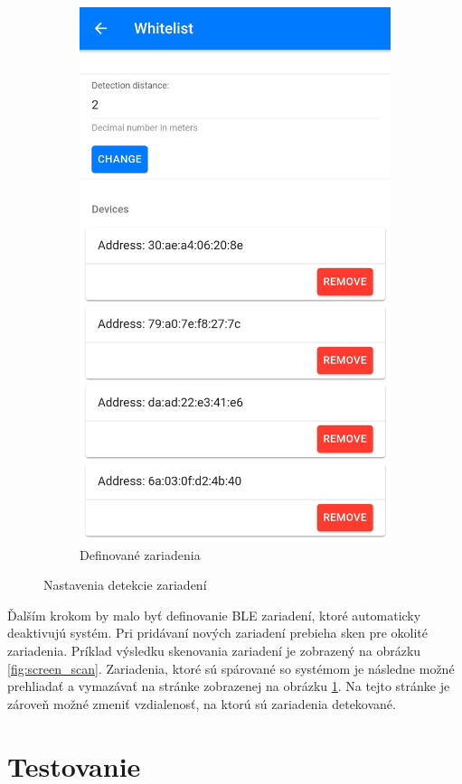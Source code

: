 \begin{figure}[!ht]
\begin{subfigure}{.4\textwidth}
      \includegraphics[width=.8\linewidth]{obrazky-figures/screen_whitelist.jpg}
      \caption{Definované zariadenia}
      \label{fig:screen_whitelist}
    \end{subfigure}
    \caption{Nastavenia detekcie zariadení}
    \label{fig:nastavenie_ble_zariadeni}
\end{figure}

Ďalším krokom by malo byť definovanie BLE zariadení, ktoré automaticky deaktivujú systém. Pri pridávaní nových zariadení prebieha sken pre okolité zariadenia. Príklad výsledku skenovania zariadení je zobrazený na obrázku \ref{fig:screen_scan}. Zariadenia, ktoré sú spárované so systémom je následne možné prehliadať a vymazávať na stránke zobrazenej na obrázku \ref{fig:screen_whitelist}. Na tejto stránke je zároveň možné zmeniť vzdialenosť, na ktorú sú zariadenia detekované.


\section{Testovanie}

